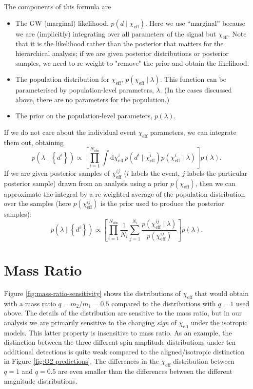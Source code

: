 \documentclass[modern,linenumbers]{aastex61}
\newcommand{\chieff}{\chi_\mathrm{eff}}
\newcommand{\dd}{\mathrm{d}}
\begin{document}
The components of this formula are
\begin{itemize}
\item The GW (marginal) likelihood, $p\left(d \mid \chieff\right)$.
  Here we use ``marginal'' because we are (implicitly) integrating
  over all parameters of the signal but $\chieff$.  Note that it is
  the likelihood rather than the posterior that matters for the
  hierarchical analysis; if we are given posterior distributions or
  posterior samples, we need to re-weight to "remove" the prior and
  obtain the likelihood.
\item The population distribution for $\chieff$,
  $p\left( \chieff \mid \lambda \right)$.  This function can be
  parameterised by population-level parameters, $\lambda$.  (In the
  cases discussed above, there are no parameters for the population.)
\item The prior on the population-level parameters, $p(\lambda)$.
\end{itemize}
If we do not care about the individual event $\chieff$ parameters, we
can integrate them out, obtaining
\begin{equation}
  p\left( \lambda \mid \left\{ d^i \right\} \right) \propto \left[ \prod_{i=1}^{N_\mathrm{obs}} \int \dd \chieff^i \, p\left(d^i \mid \chieff^i \right) p\left( \chieff^i \mid \lambda \right) \right] p\left(\lambda\right).
\end{equation}
If we are given posterior samples of $\chieff^{ij}$ ($i$ labels the
event, $j$ labels the particular posterior sample) drawn from an
analysis using a prior $p\left( \chieff \right)$, then we can
approximate the integral by a re-weighted average of the population
distribution over the samples (here $p\left( \chieff^{ij} \right)$ is
the prior used to produce the posterior samples):
\begin{equation}
  p\left( \lambda \mid \left\{ d^i \right\} \right) \propto \left[ \prod_{i=1}^{N_\mathrm{obs}} \frac{1}{N_i} \sum_{j=1}^{N_i} \frac{p\left( \chieff^{ij} \mid \lambda \right)}{p\left( \chieff^{ij} \right)} \right] p\left(\lambda\right).
\end{equation}

\section{Mass Ratio}
\label{sec:mass-ratio}

Figure \ref{fig:mass-ratio-sensitivity} shows the distributions of
$\chieff$ that would obtain with a mass ratio $q = m_2/m_1 = 0.5$
compared to the distributions with $q = 1$ used above.  The details of
the distribution are sensitive to the mass ratio, but in our analysis
we are primarily sensitive to the changing \emph{sign} of $\chieff$
under the isotropic models.  This latter property is insensitive to
mass ratio.  As an example, the distinction between the three
different spin amplitude distributions under ten additional detections
is quite weak compared to the aligned/isotropic distinction in Figure
\ref{fig:O2-predictions}.  The differences in the $\chieff$
distribution between $q = 1$ and $q = 0.5$ are even smaller than the
differences between the different magnitude distributions.
\end{document}

